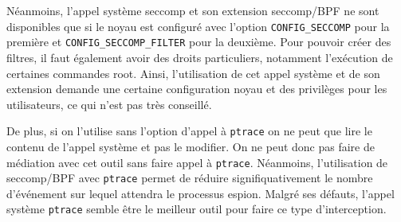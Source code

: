 Néanmoins, l'appel système seccomp et son extension seccomp/BPF ne sont
disponibles que si le noyau est configuré avec l'option \texttt{CONFIG\_SECCOMP}
pour la première et \texttt{CONFIG\_SECCOMP\_FILTER} pour la deuxième. Pour
pouvoir créer des filtres, il faut également avoir des droits particuliers,
notamment l'exécution de certaines commandes root. Ainsi, l'utilisation de cet
appel système et de son extension demande une certaine configuration noyau et
des privilèges pour les utilisateurs, ce qui n'est pas très conseillé.

De plus, si on l'utilise sans l'option d'appel à \texttt{ptrace} on ne peut que
lire le contenu de l'appel système et pas le modifier. On ne peut donc pas faire
de médiation avec cet outil sans faire appel à \texttt{ptrace}. Néanmoins,
l'utilisation de seccomp/BPF avec \texttt{ptrace} permet de réduire
signifiquativement le nombre d'événement sur lequel attendra le processus
espion.
\newline
Malgré ses défauts, l'appel système \texttt{ptrace} semble être le meilleur
outil pour faire ce type d'interception. 

